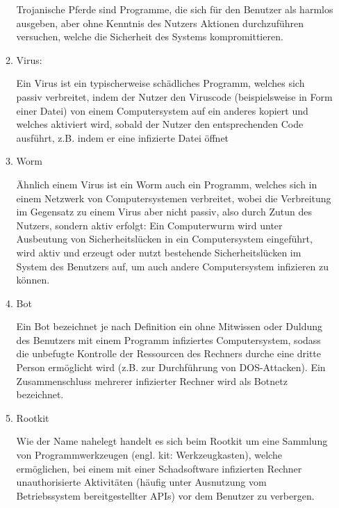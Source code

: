 \documentclass[numbers=noendperiod]{scrartcl}
\begin{document}
\begin{enumerate}[a)]
\begin{enumerate}
		Trojanische Pferde sind Programme, die sich für den Benutzer als harmlos ausgeben, aber ohne Kenntnis des
		Nutzers Aktionen durchzuführen versuchen, welche die Sicherheit des Systems kompromittieren.
		
		\item Virus:
		
		Ein Virus ist ein typischerweise schädliches Programm, welches sich passiv verbreitet, indem der Nutzer den Viruscode (beispielsweise in Form einer Datei) von einem Computersystem auf ein anderes kopiert und welches aktiviert wird, sobald der Nutzer den entsprechenden Code ausführt, z.B. indem er eine infizierte Datei öffnet
		
		\item Worm
		
		Ähnlich einem Virus ist ein Worm auch ein Programm, welches sich in einem Netzwerk von Computersystemen verbreitet, wobei die Verbreitung im Gegensatz zu einem Virus aber nicht passiv, also durch Zutun des Nutzers, sondern aktiv erfolgt: Ein Computerwurm wird unter Ausbeutung von Sicherheitslücken in ein Computersystem eingeführt, wird aktiv und erzeugt oder nutzt bestehende Sicherheitslücken im System des Benutzers auf, um auch andere Computersystem infizieren zu können.
		
		\item Bot
		
		Ein Bot bezeichnet je nach Definition ein ohne Mitwissen oder Duldung des Benutzers mit einem Programm infiziertes Computersystem, sodass die unbefugte Kontrolle der Ressourcen des Rechners durche eine dritte Person ermöglicht wird (z.B. zur Durchführung von DOS-Attacken). Ein Zusammenschluss mehrerer infizierter Rechner wird als Botnetz bezeichnet.
		
		\item Rootkit
		
		Wie der Name nahelegt handelt es sich beim Rootkit um eine Sammlung von Programmwerkzeugen (engl. kit: Werkzeugkasten), welche ermöglichen, bei einem mit einer Schadsoftware infizierten Rechner unauthorisierte Aktivitäten (häufig unter Ausnutzung vom Betriebssystem bereitgestellter APIs) vor dem Benutzer zu verbergen.
		
		
	\end{enumerate}


\end{enumerate}
\end{document}
